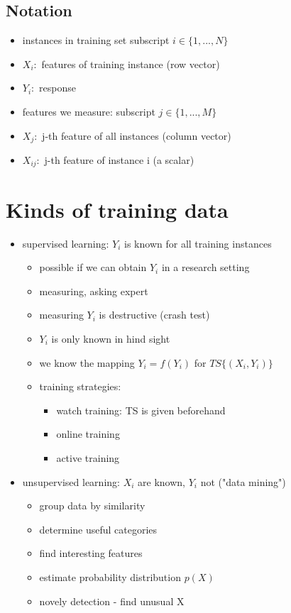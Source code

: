 \documentclass[11pt]{article}
\begin{document}
    \subsection*{Notation}
    \begin{itemize}
      \item instances in training set subscript $i \in \{ 1,..., N\}$
      \item $X_{i}:$ features of training instance (row vector)
      \item$Y_{i}:$ response
      \item features we measure: subscript $j \in \{1,...,M\}$
      \item $X_{j}:$ j-th feature of all instances (column vector)
      \item $X_{ij}:$ j-th feature of instance i (a scalar)
    \end{itemize}
  \section*{Kinds of training data}
    \begin{itemize}
      \item supervised learning: $Y_{i}$ is known for all training instances
        \begin{itemize}
          \item possible if we can obtain $Y_{i}$ in a research setting
          \item measuring, asking expert
          \item measuring $Y_{i}$ is destructive (crash test)
          \item $Y_{i}$ is only known in hind sight
          \item we know the mapping $Y_{i} = f(Y_{i})$ for $TS\{(X_{i}, Y_{i})\}$
          \item training strategies:
          \begin{itemize}
            \item watch training: TS is given beforehand
            \item online training
            \item active training
          \end{itemize}
        \end{itemize}
        \item unsupervised learning: $X_{i}$ are known, $Y_{i}$ not ("data mining")
        \begin{itemize}
          \item group data by similarity
          \item determine useful categories
          \item find interesting features
          \item estimate probability distribution $p(X)$
          \item novely detection - find unusual X
        \end{itemize}
    \end{itemize}
\end{document}
